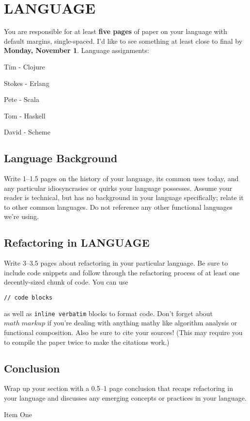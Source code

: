 \documentclass{article}
\begin{document}

\section{LANGUAGE}

You are responsible for at least \textbf{five pages} of paper on your language with default margins, single-spaced. I'd like to see something at least close to final by \textbf{Monday, November 1}. Language assignments:

\begin{itemize*}
\item Tim - Clojure
\item Stokes - Erlang
\item Pete - Scala
\item Tom - Haskell
\item David - Scheme
\end{itemize*}

\subsection{Language Background}

Write 1--1.5 pages on the history of your language, its common uses today, and any particular idiosyncrasies or quirks your language possesses. Assume your reader is technical, but has no background in your language specifically; relate it to other common languages. Do not reference any other functional languages we're using.

\subsection{Refactoring in LANGUAGE}

Write 3--3.5 pages about refactoring in your particular language. Be sure to include code snippets and follow through the refactoring process of at least one decently-sized chunk of code. You can use

\begin{verbatim}
// code blocks
\end{verbatim}

as well as \verb!inline verbatim! blocks to format code. Don't forget about $math \; markup$ if you're dealing with anything mathy like algorithm analysis or functional composition. Also be sure to cite your sources! (This may require you to compile the paper twice to make the citations work\cite{Item1}.)

\subsection{Conclusion}

Wrap up your section with a 0.5--1 page conclusion that recaps refactoring in your language and discusses any emerging concepts or practices in your language.

\begin{thebibliography}{9}
 Item One
\end{thebibliography}
\end{document}
